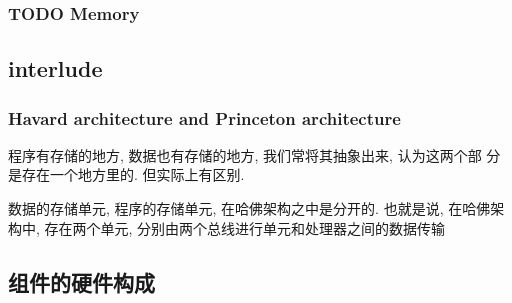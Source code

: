 \documentclass[11pt]{ctexart}
\begin{document}
\subsubsection{{\bfseries\sffamily TODO} Memory}
\label{sec:orgce7636c}
\subsection{interlude}
\label{sec:orgfac225b}
\subsubsection{Havard architecture and Princeton architecture}
\label{sec:org392c0b1}
程序有存储的地方, 数据也有存储的地方, 我们常将其抽象出来, 认为这两个部
分是存在一个地方里的. 但实际上有区别. 

数据的存储单元, 程序的存储单元, 在哈佛架构之中是分开的. 
也就是说, 在哈佛架构中, 存在两个单元, 分别由两个总线进行单元和处理器之间的数据传输
\subsection{组件的硬件构成}
\label{sec:orgfcf623a}
\end{document}
